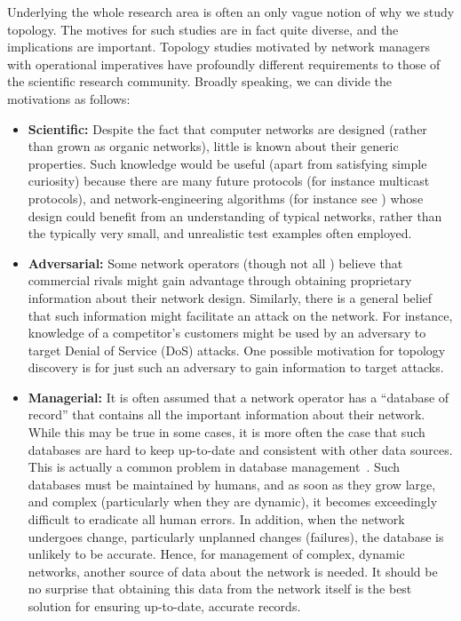 Underlying the whole research area is often an only vague notion of
why we study topology. The motives for such studies are in fact quite
diverse, and the implications are important. Topology studies
motivated by network managers with operational imperatives have
profoundly different requirements to those of the scientific research
community. Broadly speaking, we can divide the motivations as follows:
\begin{itemize}

\item {\bf Scientific:} Despite the fact that computer networks are
  designed (rather than grown as organic networks), little is known
  about their generic properties. Such knowledge would be useful
  (apart from satisfying simple curiosity) because there are many
  future protocols (for instance multicast protocols), and
  network-engineering algorithms (for instance see \cite{fortz00})
  whose design could benefit from an understanding of typical
  networks, rather than the typically very small, and unrealistic test
  examples often employed.

\item {\bf Adversarial:} Some network operators (though not all
  \cite{Zoo}) believe that commercial rivals might gain advantage
  through obtaining proprietary information about their network
  design. Similarly, there is a general belief that such information
  might facilitate an attack on the network. For instance, knowledge
  of a competitor's customers might be used by an adversary to target
  Denial of Service (DoS) attacks. One possible motivation for
  topology discovery is for just such an adversary to gain information
  to target attacks. 

\item {\bf Managerial:} It is often assumed that a network operator
  has a ``database of record'' that contains all the important
  information about their network. While this may be true in some
  cases, it is more often the case that such databases are hard to
  keep up-to-date and consistent with other data sources. This is
  actually a common problem in database
  management~\cite{dasu03:_data_mining}. Such databases must be
  maintained by humans, and as soon as they grow large, and complex
  (particularly when they are dynamic), it becomes exceedingly
  difficult to eradicate all human errors.  In addition, when the
  network undergoes change, particularly unplanned changes (failures),
  the database is unlikely to be accurate. Hence, for management of
  complex, dynamic networks, another source of data about the network
  is needed. It should be no surprise that obtaining this data from
  the network itself is the best solution for ensuring up-to-date,
  accurate records.


\end{itemize}
